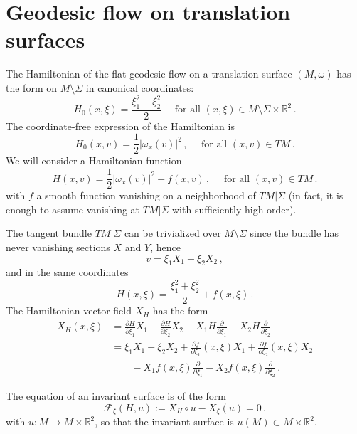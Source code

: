 \documentclass[11pt]{amsart}
\newcommand \R {{ \mathbb R}}
\begin{document}
\section{ Geodesic flow on translation surfaces}

The Hamiltonian of the flat geodesic flow on a translation surface $(M, \omega)$ has the form on $M\setminus \Sigma$ in canonical coordinates:
$$
H_0(x, \xi) = \frac{\xi_1^2 + \xi_2^2}{2}  \quad \text{ for all } (x, \xi) \in M\setminus \Sigma \times \R^2\,.
$$
The coordinate-free expression of the Hamiltonian is
$$
H_0(x, v) = \frac{1}{2}  \vert \omega_x (v ) \vert^2 \,, \quad \text{ for all }  (x,v) \in TM\,.
$$
We will consider a Hamiltonian function
$$
H(x, v) =   \frac{1}{2}  \vert \omega_x (v ) \vert^2  + f(x, v) \,, \quad \text{ for all }  (x,v) \in TM\,.
$$
with $f$ a smooth function vanishing on a neighborhood of $TM \vert \Sigma$ (in fact, it is enough to assume vanishing
at $TM \vert \Sigma$  with sufficiently high order).

The tangent bundle $TM \vert \Sigma$ can be trivialized over $M\setminus \Sigma$ since the bundle has never vanishing sections
$X$ and $Y$, hence 
$$
v = \xi_1 X_1+ \xi_2 X_2 \,,
$$
and in the same coordinates
$$
H(x, \xi) = \frac{\xi_1^2 + \xi_2^2}{2}  + f(x, \xi)\,.
$$
The Hamiltonian vector field $X_H$ has the form
$$
\begin{aligned}
X_H (x,\xi)  &=  \frac{\partial H}{\partial \xi_1} X_1 +  \frac{\partial H}{\partial \xi_2} X_2 -  X_1 H \frac{\partial}{\partial \xi_1}
 -  X_2H  \frac{\partial}{\partial \xi_2} \\
&=  
\xi_1 X_1 + \xi_2 X_2 +  \frac{\partial f}{\partial \xi_1}(x,\xi) X_1 + \frac{\partial f}{\partial \xi_2}(x,\xi) X_2  \\ 
    &\quad \quad  -  X_1 f (x,\xi) \frac{\partial}{\partial \xi_1} -  X_2 f (x,\xi) \frac{\partial}{\partial \xi_2}\,. 
\end{aligned}
$$

The equation of an invariant surface is of the form 
\begin{equation}
\label{eq:inv_surf}
\mathcal{F}_\xi(H, u) := X_H \circ u - X_\xi (u) =0 \,.
\end{equation}
with $u: M \to M\times \R^2$, so that the invariant surface is $u(M) \subset M\times \R^2$.
\end{document}

